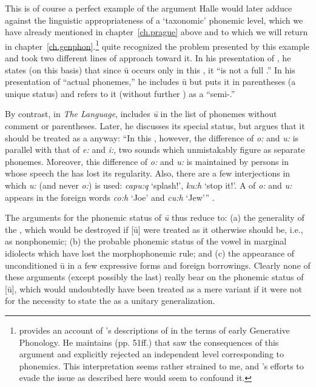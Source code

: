 This is of course a perfect example of the argument Halle would later
adduce against the linguistic appropriateness of a `taxonomic'
phonemic level, which we have already mentioned in
chapter~\ref{ch.prague} above and to which we will return in
chapter~\ref{ch.genphon}.\footnote{\citet{bever67:thesis} provides an
  account of {\Bloomfield}'s descriptions of  in the terms of
  early Generative Phonology. He maintains (pp. 51ff.) that {\Bloomfield}
  saw the consequences of this argument and explicitly rejected an
  independent level corresponding to phonemics. This interpretation
  seems rather strained to me, and {\Bloomfield}'s efforts to evade the
  issue as described here would seem to confound it.} {\Bloomfield} quite
recognized the problem presented by this example and took two
different lines of approach toward it. In his
\citeyear{bloomfield:menomini_morphophonemics} presentation of
, he states (on this basis) that since ū occurs only in this
, it ``is not a full .'' In his presentation of
``actual  phonemes,'' he includes ū but puts it in parentheses
(a unique status) and refers to it (without further ) as a
``semi-.''

By {contrast}, in \textsl{The  Language},
\citet{bloomfield62:menomini} includes \emph{ū} in the list of
phonemes without comment or parentheses. Later, he discusses its
special status, but argues that it should be treated as a 
anyway: ``In this , however, the difference of \emph{o:} and
\emph{u:} is parallel with that of \emph{e:} and \emph{i:}, two sounds
which unmistakably figure as separate phonemes. Moreover, this
difference of \emph{o:} and \emph{u:} is maintained by persons in
whose speech the  has lost its regularity. Also, there are
a few interjections in which \emph{u:} (and never \emph{o:}) is used:
\emph{capu:q} `splash!', \emph{ku:h} `stop it!'. A  of
\emph{o:} and \emph{u:} appears in the foreign words \emph{co:h} `Joe'
and \emph{cu:h} `Jew''' \citep[5]{bloomfield62:menomini}.

The arguments for the phonemic status of \emph{ū} thus reduce to: (a)
the generality of the , which would be destroyed if [ū]
were treated as it otherwise should be, i.e., as nonphonemic; (b) the
probable phonemic status of the vowel in marginal idiolects which have
lost the  morphophonemic rule; and (c) the appearance of
unconditioned ū in a few expressive forms and foreign
borrowings. Clearly none of these arguments (except possibly the last)
really bear on the phonemic status of [ū], which would undoubtedly
have been treated as a mere variant if it were not for the necessity
to state the  as a unitary generalization.

